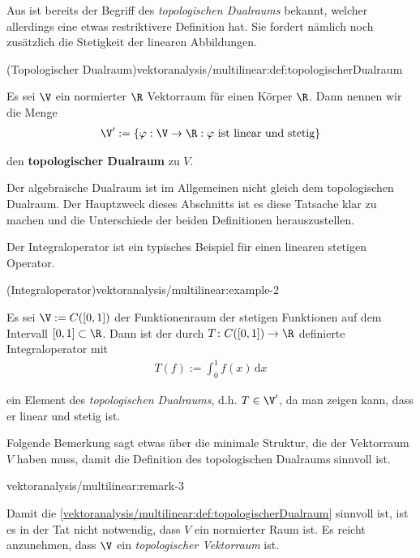 \documentclass[letterpaper,10pt,german]{jupyterBook}
\begin{document}
\par
Aus \cite{Ten21} ist bereits der Begriff des \emph{topologischen Dualraums} bekannt, welcher allerdings eine etwas restriktivere Definition hat.
Sie fordert nämlich noch zusätzlich die Stetigkeit der linearen Abbildungen.
\begin{definition}{(Topologischer Dualraum)}{vektoranalysis/multilinear:def:topologischerDualraum}



\par
Es sei \(\V\) ein normierter \(\R\) Vektorraum für einen Körper \(\R\).
Dann nennen wir die Menge
\begin{align*}
\V^\prime := \{\varphi:\V\rightarrow\R: \varphi\text{ ist linear und stetig}\}
\end{align*}
\par
den \textbf{topologischer Dualraum} zu \(V\).
\end{definition}

\begin{emphBox}{}{}
\par
Der algebraische Dualraum ist im Allgemeinen nicht gleich dem topologischen Dualraum.
Der Hauptzweck dieses Abschnitts ist es diese Tatsache klar zu machen und die Unterschiede der beiden Definitionen herauszustellen.
\end{emphBox}

\par
Der Integraloperator ist ein typisches Beispiel für einen linearen stetigen Operator.
\begin{example}{(Integraloperator)}{vektoranalysis/multilinear:example-2}



\par
Es sei \(\V := C([0,1])\) der Funktionenraum der stetigen Funktionen auf dem Intervall \([0,1] \subset \R\).
Dann ist der durch \(T \colon C([0,1]) \rightarrow \R\) definierte Integraloperator mit
\begin{align*}
T(f) := \int_0^1 f(x) \, \mathrm{d}x
\end{align*}
\par
ein Element des \emph{topologischen Dualraums}, d.h. \(T \in \V^\prime\), da man zeigen kann, dass er linear und stetig ist.
\end{example}

\par
Folgende Bemerkung sagt etwas über die minimale Struktur, die der Vektorraum \(V\) haben muss, damit die Definition des topologischen Dualraums sinnvoll ist.
\begin{remark}{}{vektoranalysis/multilinear:remark-3}



\par
Damit die \cref{vektoranalysis/multilinear:def:topologischerDualraum} sinnvoll ist, ist es in der Tat nicht notwendig, dass \(V\) ein normierter Raum ist. Es reicht anzunehmen, dass \(\V\) ein \emph{topologischer Vektorraum} ist.
\end{remark}
\end{document}
